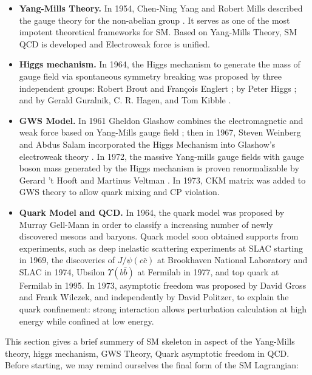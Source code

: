 \begin{itemize}
    \item \textbf{Yang-Mills Theory.} In 1954, Chen-Ning Yang and Robert Mills described the gauge theory for the non-abelian group \cite{PhysRev.96.191}. It serves as one of the most impotent theoretical frameworks for SM. Based on Yang-Mills Theory, SM QCD is developed and Electroweak force is unified. 
    
    \item \textbf{Higgs mechanism.} In 1964, the Higgs mechanism to generate the mass of gauge field via spontaneous symmetry breaking was proposed by three independent groups: Robert Brout and François Englert \cite{PhysRevLett.13.321}; by Peter Higgs \cite{PhysRevLett.13.508}; and by Gerald Guralnik, C. R. Hagen, and Tom Kibble \cite{PhysRevLett.13.585}. 
    
    \item \textbf{GWS Model.} In 1961 Gheldon Glashow combines the electromagnetic and weak force based on Yang-Mills gauge field \cite{Glashow:1961tr}; then in 1967, Steven Weinberg and Abdus Salam incorporated the Higgs Mechanism into Glashow's electroweak theory \cite{PhysRevLett.19.1264}. In 1972, the massive Yang-mills gauge fields with gauge boson mass generated by the Higgs mechanism is proven renormalizable by Gerard 't Hooft and Martinus Veltman \cite{tHooft:1972tcz}. In 1973, CKM matrix was added to GWS theory to allow quark mixing and CP violation.
    
    \item \textbf{Quark Model and QCD.} In 1964, the quark model was proposed by Murray Gell-Mann in order to classify a increasing number of newly discovered mesons and baryons. Quark model soon obtained supports from experiments, such as deep inelastic scattering experiments at SLAC starting in 1969, the discoveries of $J/\psi (c\bar{c})$ at Brookhaven National Laboratory and SLAC in 1974, Ubsilon $\Upsilon (b\bar{b})$ at Fermilab in 1977, and top quark at Fermilab in 1995.  In 1973, asymptotic freedom was proposed by David Gross and Frank Wilczek, and independently by David Politzer, to explain the quark confinement: strong interaction allows perturbation calculation at high energy while confined at low energy.
\end{itemize}

This section gives a brief summery of SM skeleton in aspect of the Yang-Mills theory, higgs mechanism, GWS Theory, Quark asymptotic freedom in QCD. Before starting, we may remind ourselves the final form of the SM Lagrangian:

